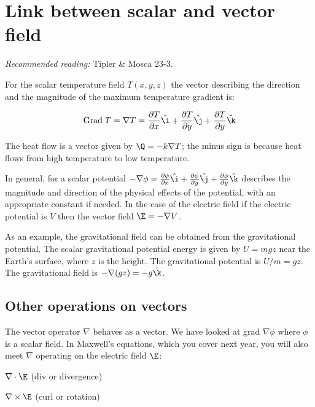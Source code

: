 \documentclass[
]{book}
\begin{document}
\hypertarget{link-between-scalar-and-vector-field}{%
\section{Link between scalar and vector field}\label{link-between-scalar-and-vector-field}}

\emph{Recommended reading:} Tipler \& Mosca 23-3.

For the scalar temperature field \(T(x,y,z)\) the vector describing the
direction and the magnitude of the maximum temperature gradient is:

\[\begin{aligned}
 \text{Grad} \; T = \nabla T = \frac{\partial T} {\partial x} \hat{\i} + \frac{\partial T}{\partial y} \hat{\j} + \frac{\partial T}{\partial y} \hat{\k}
\end{aligned}\]

The heat flow is a vector given by \(\Q = -k \nabla T\); the minus sign is
because heat flows from high temperature to low temperature.

In general, for a scalar potential
\(-\nabla \phi = \frac{\partial \phi} {\partial x} \hat{\i} + \frac{\partial \phi}{\partial y} \hat{\j} + \frac{\partial \phi}{\partial y} \hat{\k}\)
describes the magnitude and direction of the physical effects of the
potential, with an appropriate constant if needed. In the case of the
electric field if the electric potential is \(V\) then the vector field
\(\E = -\nabla V\).

As an example, the gravitational field can be obtained from the
gravitational potential. The scalar gravitational potential energy is
given by \(U = mgz\) near the Earth's surface, where \(z\) is the height.
The gravitational potential is \(U/m = gz\). The gravitational field is
\(-\nabla(gz)=-g \hat{\k}\).

\hypertarget{other-operations-on-vectors}{%
\subsection{Other operations on vectors}\label{other-operations-on-vectors}}

The vector operator \(\nabla\) behaves as a vector. We have looked at grad
\(\nabla\phi\) where \(\phi\) is a scalar field. In Maxwell's equations,
which you cover next year, you will also meet \(\nabla\) operating on the
electric field \(\E\):

\(\nabla \cdot \E\) (div or divergence)

\(\nabla \times \E\) (curl or rotation)
\end{document}
